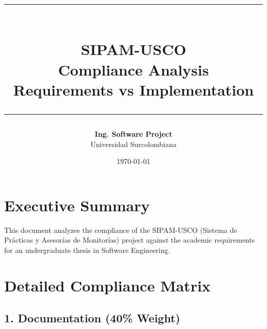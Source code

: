 \documentclass[12pt,a4paper]{article}
\title{
    \vspace{-1cm}
    \textcolor{uscoRed}{\rule{\textwidth}{2pt}}\\[0.3cm]
    \textbf{\Huge SIPAM-USCO}\\[0.2cm]
    \Large Compliance Analysis\\
    \Large Requirements vs Implementation\\[0.3cm]
    \textcolor{uscoRed}{\rule{\textwidth}{2pt}}
}
\author{
    \textbf{Ing. Software Project}\\
    Universidad Surcolombiana
}
\date{\today}
\begin{document}
\maketitle

\section{Executive Summary}

This document analyzes the compliance of the SIPAM-USCO (Sistema de Prácticas y Asesorías de Monitorías) project against the academic requirements for an undergraduate thesis in Software Engineering.

\begin{center}
\end{center}

\section{Detailed Compliance Matrix}

\subsection{1. Documentation (40\% Weight)}
\end{document}
